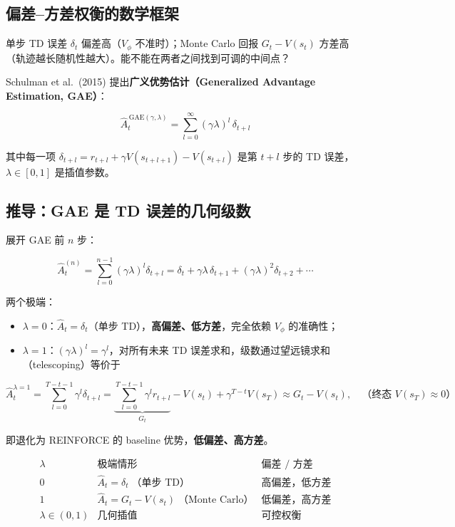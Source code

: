 \documentclass{article}
\begin{document}
\subsection*{偏差--方差权衡的数学框架}

单步 TD 误差 $\delta_t$ 偏差高（$V_\phi$ 不准时）；Monte Carlo 回报 $G_t - V(s_t)$ 方差高（轨迹越长随机性越大）。能不能在两者之间找到可调的中间点？

Schulman et al.\ (2015) 提出\textbf{广义优势估计（Generalized Advantage Estimation, GAE）}：

\[
\boxed{\hat{A}_t^{\,\text{GAE}(\gamma,\lambda)} = \sum_{l=0}^{\infty} (\gamma\lambda)^l \,\delta_{t+l}}
\]

其中每一项 $\delta_{t+l} = r_{t+l} + \gamma V(s_{t+l+1}) - V(s_{t+l})$ 是第 $t+l$ 步的 TD 误差，$\lambda \in [0,1]$ 是插值参数。

\subsection*{推导：GAE 是 TD 误差的几何级数}

展开 GAE 前 $n$ 步：

\[
\hat{A}_t^{(n)} = \sum_{l=0}^{n-1} (\gamma\lambda)^l \delta_{t+l}
= \delta_t + \gamma\lambda\,\delta_{t+1} + (\gamma\lambda)^2 \delta_{t+2} + \cdots
\]

两个极端：

\begin{itemize}
  \item $\lambda = 0$：$\hat{A}_t = \delta_t$（单步 TD），\textbf{高偏差、低方差}，完全依赖 $V_\phi$ 的准确性；
  \item $\lambda = 1$：$(\gamma\lambda)^l = \gamma^l$，对所有未来 TD 误差求和，级数通过望远镜求和（telescoping）等价于
\end{itemize}

\[
\hat{A}_t^{\lambda=1} = \sum_{l=0}^{T-t-1}\gamma^l \delta_{t+l}
= \underbrace{\sum_{l=0}^{T-t-1}\gamma^l r_{t+l}}_{G_t} - V(s_t) + \gamma^{T-t}V(s_T)
\approx G_t - V(s_t), \quad \text{（终态 }V(s_T)\approx 0\text{）}
\]

即退化为 REINFORCE 的 baseline 优势，\textbf{低偏差、高方差}。

\[
\begin{array}{c|c|c}
\lambda & \text{极端情形} & \text{偏差 / 方差} \\
\hline
0 & \hat{A}_t = \delta_t \;\text{（单步 TD）} & \text{高偏差，低方差} \\
1 & \hat{A}_t = G_t - V(s_t) \;\text{（Monte Carlo）} & \text{低偏差，高方差} \\
\lambda \in (0,1) & \text{几何插值} & \text{可控权衡} \\
\end{array}
\]
\end{document}
